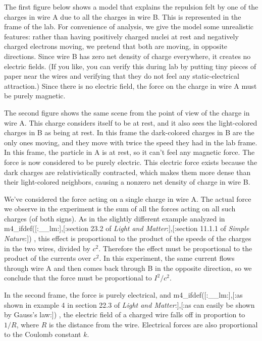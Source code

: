 \analysis

The first figure below shows a model that explains the repulsion felt by
one of the charges in wire A due to all the charges in wire B. This
is represented in the frame of the lab. For convenience of analysis,
we give the model some unrealistic features: rather than having positively
charged nuclei at rest and negatively charged electrons moving, we pretend
that both are moving, in opposite directions. Since wire B has zero net
density of charge everywhere, it creates no electric fields. (If you like,
you can verify this during lab by putting tiny pieces of paper near the
wires and verifying that they do not feel any static-electrical attraction.)
Since there is no electric field, the force on
the charge in wire A must be purely magnetic.


The second figure shows the same scene from the point of view of the
charge in wire A. This charge considers itself to be at rest, and it
also sees the light-colored charges in B as being at rest. In this
frame the dark-colored charges in B are the only ones moving, and they
move with twice the
speed they had in the lab frame. In this frame, the particle in A
is at rest, so it can't feel any magnetic force. The force is now
considered to be purely electric. This electric force exists because
the dark charges are relativistically contracted, which makes them more dense than their
light-colored neighbors, causing a nonzero net density of charge in
wire B. 


We've considered the force acting on a single charge in wire A. The
actual force we observe in the experiment is the sum of all the forces
acting on all such charges (of both signs).
As in the slightly different example analyzed in 
m4_ifdef([:__lm:],[:section 23.2 of \emph{Light and Matter}:],[:section 11.1.1 of \emph{Simple Nature}:])%
, this effect is proportional to the product
of the speeds of the charges in the two wires, divided by $c^2$.
Therefore the effect must
be proportional to the product of the currents over $c^2$. In this experiment, the
same current flows through wire A and then comes back through B in the opposite
direction, so we conclude that the force must be proportional to $I^2/c^2$.

In the second frame, the force is purely electrical, and 
m4_ifdef([:__lm:],[:as shown in example 4 in section 22.3 of \emph{Light and Matter}:],[:as can easily be shown by Gauss's law:])%
, the electric field of a charged
wire falls off in proportion to $1/R$, where $R$ is the distance from the
wire. Electrical forces are also proportional to the Coulomb constant $k$.

